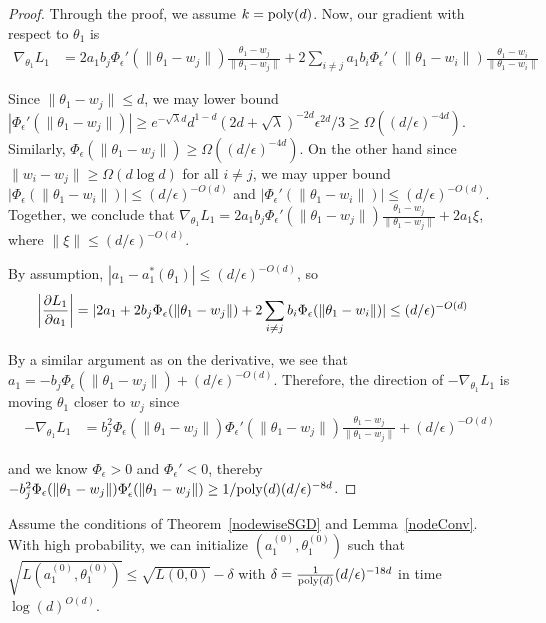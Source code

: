 \begin{proof}
Through the proof, we assume $k = \mathrm{poly}(d)$. Now, our gradient with respect to $\theta_1$ is
%
\begin{align*}
\nabla_{\theta_1} L_1 &= 2a_1b_j \Phi_\epsilon'(\|\theta_1 - w_j\|) \frac{\theta_1 - w_j}{\|\theta_1 - w_j\|}+ 2\sum_{i\neq j} a_1b_i\Phi_\epsilon'(\|\theta_1 - w_i\|) \frac{\theta_1 - w_i}{\|\theta_1 - w_i\|}
\end{align*}
%

Since $\|\theta_1 - w_j\| \leq d$, we may lower bound $|\Phi_\epsilon'(\|\theta_1 - w_j\|)| \geq e^{-\sqrt{\lambda}d}d^{1-d}(2d+\sqrt{\lambda})^{-2d}\epsilon^{2d}/3 \geq \Omega((d/\epsilon)^{-4d})$. Similarly, $\Phi_\epsilon(\|\theta_1 - w_j\|) \geq \Omega((d/\epsilon)^{-4d})$. On the other hand since $\|w_i - w_j\| \geq \Omega(d \log d)$ for all $i \neq j$, we may upper bound $|\Phi_{\epsilon}(\|\theta_1 - w_i\|)| \leq (d/\epsilon)^{-O(d)}$ and $|\Phi_{\epsilon}'(\|\theta_1 - w_i\|)| \leq (d/\epsilon)^{-O(d)}$. Together, we conclude that $\nabla_{\theta_1} L_1 = 2a_1b_j \Phi_\epsilon'(\|\theta_1 - w_j\|) \frac{\theta_1 - w_j}{\|\theta_1 - w_j\|} + 2a_1\xi$, where $\|\xi\| \leq (d/\epsilon)^{-O(d)}$.

By assumption, $|a_1 - a_1^*(\theta_1)| \leq (d/\epsilon)^{-O(d)}$, so 
%
\begin{align*}
   \left| \frac{\partial L_1}{\partial a_1} \right| & = \lvert 2a_1 + 2b_j \Phi_\epsilon(\|\theta_1 - w_j\|) + 2\sum_{i \neq j} b_i \Phi_\epsilon(\|\theta_1 - w_i\|) \rvert \leq (d/\epsilon)^{-O(d)}
\end{align*}

By a similar argument as on the derivative, we see that $a_1 = -b_j \Phi_\epsilon(\|\theta_1 - w_j\|) + (d/\epsilon)^{-O(d)}$. Therefore, the direction of $-\nabla_{\theta_1} L_1$ is moving $\theta_1$ closer to $w_j$ since 
%
\begin{align*}
-\nabla_{\theta_1} L_1 &=  b_j^2\Phi_\epsilon(\|\theta_1-w_j\|)\Phi_\epsilon'(\|\theta_1 - w_j\|) \frac{\theta_1 - w_j}{\|\theta_1 - w_j\|} + (d/\epsilon)^{-O(d)} 
\end{align*}

and we know $\Phi_\epsilon > 0$ and $\Phi_\epsilon' < 0$, thereby $-b_j^2\Phi_\epsilon(\|\theta_1-w_j\|)\Phi_\epsilon'(\|\theta_1 - w_j\|) \geq 1/\mathrm{poly}(d)(d/\epsilon)^{-8d}$.
\end{proof}

 
 \begin{lemma}\label{nodeInitialize}
Assume the conditions of Theorem~\ref{nodewiseSGD} and Lemma~\ref{nodeConv}. With high probability, we can initialize $(a_1^{(0)},\theta_1^{(0)})$ such that $\sqrt{L(a_1^{(0)},\theta_1^{(0)})} \leq \sqrt{L({0,0})} -\delta$ with $\delta = \frac{1}{\mathrm{poly}(d)}(d/\epsilon)^{ -18d}$ in time $\log(d)^{O(d)}$.
 \end{lemma}

